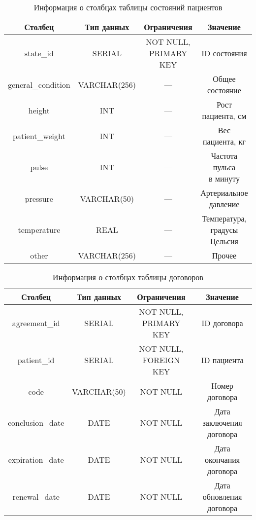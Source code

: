 \begin{table}[h!]
\begin{center}
	\captionsetup{justification=raggedright,singlelinecheck=off,margin=5mm}
	\caption{Информация о столбцах таблицы состояний пациентов}
	\begin{tabular}{| c | c | c | c |}
		\hline
		Столбец & Тип данных & Ограничения & Значение \\
		\hline
		state\_id & SERIAL & \makecell{NOT NULL, \\ PRIMARY KEY} & ID состояния \\
		\hline
		general\_condition & VARCHAR(256) & --- & Общее состояние \\
		\hline
		height & INT &  --- & Рост пациента, см\\
		\hline
		patient\_weight &  INT &  --- & Вес пациента, кг\\
		\hline
		pulse & INT & --- & \makecell{Частота пульса \\в минуту}\\
		\hline
		pressure & VARCHAR(50) & --- & \makecell{Артериальное \\давление }\\
		\hline
		temperature & REAL & --- & \makecell{Температура, \\градусы Цельсия} \\
		\hline
		other & VARCHAR(256) & --- & Прочее \\
		\hline
	\end{tabular}
	\label{table:states-columns}
\end{center}
\end{table}

\begin{table}[h!]
\begin{center}
	\captionsetup{justification=raggedright,singlelinecheck=off,margin=5mm}
	\caption{Информация о столбцах таблицы договоров}
	\begin{tabular}{| c | c | c | c |}
		\hline
		Столбец & Тип данных & Ограничения & Значение \\
		\hline
		agreement\_id & SERIAL & \makecell{NOT NULL, \\ PRIMARY KEY} & ID договора \\
		\hline
		patient\_id & SERIAL & \makecell{NOT NULL, \\ FOREIGN KEY} & ID пациента \\
		\hline
		code & VARCHAR(50) & NOT NULL & Номер договора \\
		\hline
		conclusion\_date & DATE & NOT NULL & \makecell{Дата заключения \\договора}\\
		\hline
		expiration\_date & DATE & NOT NULL & \makecell{Дата окончания\\договора} \\
		\hline
		renewal\_date & DATE & NOT NULL & \makecell{Дата обновления \\договора} \\
		\hline
	\end{tabular}
	\label{table:argreements-columns}
\end{center}
\end{table}

